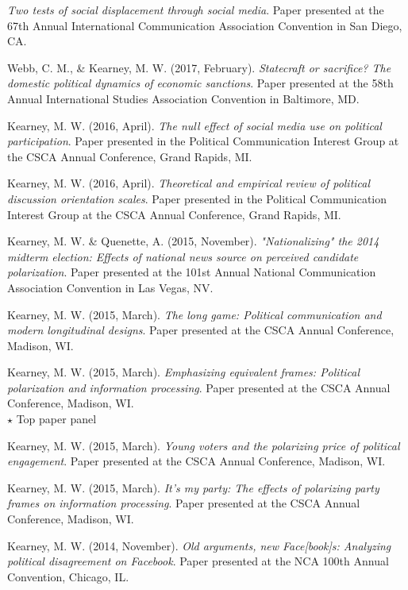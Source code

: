 \begin{bibenum}
      \textit{Two tests of social displacement through social media}.
      Paper presented at the 67th Annual International Communication Association Convention in San Diego, CA.
    \item[] Webb, C. M., \& Kearney, M. W. (2017, February).
      \textit{Statecraft or sacrifice? The domestic political dynamics of economic sanctions}.
      Paper presented at the 58th Annual International Studies Association Convention in Baltimore, MD.
    \item[] Kearney, M. W. (2016, April).
      \textit{The null effect of social media use on political participation}.
      Paper presented in the Political Communication Interest Group at the CSCA Annual Conference, Grand Rapids, MI.
    \item[] Kearney, M. W. (2016, April).
      \textit{Theoretical and empirical review of political discussion orientation scales}.
      Paper presented in the Political Communication Interest Group at the CSCA Annual Conference, Grand Rapids, MI.
    \item[] Kearney, M. W. \& Quenette, A. (2015, November).
      \textit{"Nationalizing" the 2014 midterm election: Effects of national news source on perceived candidate polarization}.
      Paper presented at the 101st Annual National Communication Association Convention in Las Vegas, NV.
    \item[] Kearney, M. W. (2015, March).
      \textit{The long game: Political communication and modern longitudinal designs}.
      Paper presented at the CSCA Annual Conference, Madison, WI.
    \item[] Kearney, M. W. (2015, March).
      \textit{Emphasizing equivalent frames: Political polarization and information processing}.
      Paper presented at the CSCA Annual Conference, Madison, WI.\\
      {$\star$} Top paper panel
    \item[] Kearney, M. W. (2015, March).
      \textit{Young voters and the polarizing price of political engagement}.
      Paper presented at the CSCA Annual Conference, Madison, WI.
    \item[] Kearney, M. W. (2015, March).
      \textit{It's my party: The effects of polarizing party frames on information processing}.
      Paper presented at the CSCA Annual Conference, Madison, WI.
    \item[] Kearney, M. W. (2014, November).
      \textit{Old arguments, new Face[book]s: Analyzing political disagreement on Facebook}.
      Paper presented at the NCA 100th Annual Convention, Chicago, IL.

\end{bibenum}
